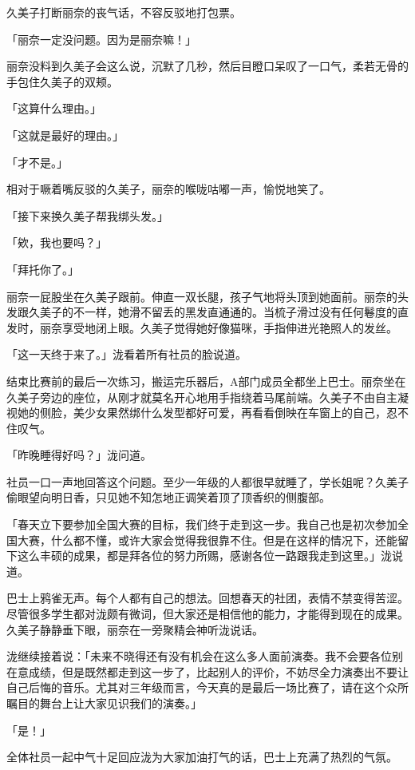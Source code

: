 \documentclass[UTF8]{ctexart}
\begin{document}
    久美子打断丽奈的丧气话，不容反驳地打包票。 

    「丽奈一定没问题。因为是丽奈嘛！」 

    丽奈没料到久美子会这么说，沉默了几秒，然后目瞪口呆叹了一口气，柔若无骨的手包住久美子的双颊。 

    「这算什么理由。」 

    「这就是最好的理由。」 

    「才不是。」 

    相对于噘着嘴反驳的久美子，丽奈的喉咙咕嘟一声，愉悦地笑了。 

    「接下来换久美子帮我绑头发。」 

    「欸，我也要吗？」 

    「拜托你了。」 

    丽奈一屁股坐在久美子跟前。伸直一双长腿，孩子气地将头顶到她面前。丽奈的头发跟久美子的不一样，她滑不留丢的黑发直通通的。当梳子滑过没有任何鬈度的直发时，丽奈享受地闭上眼。久美子觉得她好像猫咪，手指伸进光艳照人的发丝。 

    「这一天终于来了。」泷看着所有社员的脸说道。 

    结束比赛前的最后一次练习，搬运完乐器后，A部门成员全都坐上巴士。丽奈坐在久美子旁边的座位，从刚才就莫名开心地用手指绕着马尾前端。久美子不由自主凝视她的侧脸，美少女果然绑什么发型都好可爱，再看看倒映在车窗上的自己，忍不住叹气。 

    「昨晚睡得好吗？」泷问道。 

    社员一口一声地回答这个问题。至少一年级的人都很早就睡了，学长姐呢？久美子偷眼望向明日香，只见她不知怎地正调笑着顶了顶香织的侧腹部。 

    「春天立下要参加全国大赛的目标，我们终于走到这一步。我自己也是初次参加全国大赛，什么都不懂，或许大家会觉得我很靠不住。但是在这样的情况下，还能留下这么丰硕的成果，都是拜各位的努力所赐，感谢各位一路跟我走到这里。」泷说道。 

    巴士上鸦雀无声。每个人都有自己的想法。回想春天的社团，表情不禁变得苦涩。尽管很多学生都对泷颇有微词，但大家还是相信他的能力，才能得到现在的成果。久美子静静垂下眼，丽奈在一旁聚精会神听泷说话。 

    泷继续接着说：「未来不晓得还有没有机会在这么多人面前演奏。我不会要各位别在意成绩，但是既然都走到这一步了，比起别人的评价，不妨尽全力演奏出不要让自己后悔的音乐。尤其对三年级而言，今天真的是最后一场比赛了，请在这个众所瞩目的舞台上让大家见识我们的演奏。」 

    「是！」 

    全体社员一起中气十足回应泷为大家加油打气的话，巴士上充满了热烈的气氛。 
\end{document}
